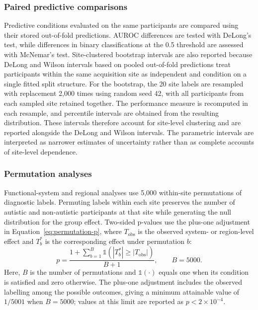 \subsubsection{Paired predictive comparisons}
\label{subsubsec:paired-comparisons}

Predictive conditions evaluated on the same participants are compared using their stored out-of-fold predictions. AUROC differences are tested with DeLong's test, while differences in binary classifications at the 0.5 threshold are assessed with McNemar's test. Site-clustered bootstrap intervals are also reported because DeLong and Wilson intervals based on pooled out-of-fold predictions treat participants within the same acquisition site as independent and condition on a single fitted split structure. For the bootstrap, the 20 site labels are resampled with replacement 2,000 times using random seed 42, with all participants from each sampled site retained together. The performance measure is recomputed in each resample, and percentile intervals are obtained from the resulting distribution. These intervals therefore account for site-level clustering and are reported alongside the DeLong and Wilson intervals. The parametric intervals are interpreted as narrower estimates of uncertainty rather than as complete accounts of site-level dependence.

\subsubsection{Permutation analyses}
\label{subsubsec:permutation-analyses}

Functional-system and regional analyses use 5,000 within-site permutations of diagnostic labels. Permuting labels within each site preserves the number of autistic and non-autistic participants at that site while generating the null distribution for the group effect. Two-sided p-values use the plus-one adjustment in Equation~\eqref{eq:permutation-p}, where $T_{\mathrm{obs}}$ is the observed system- or region-level effect and $T_b^\ast$ is the corresponding effect under permutation $b$:
\begin{equation}
p
=
\frac{
1
+
\sum_{b=1}^{B}
\mathbb{1}\left(
\left|T_b^\ast\right|
\geq
\left|T_{\mathrm{obs}}\right|
\right)
}{
B+1
},
\qquad B=5000.
\label{eq:permutation-p}
\end{equation}
Here, $B$ is the number of permutations and $\mathbb{1}(\cdot)$ equals one when its condition is satisfied and zero otherwise. The plus-one adjustment includes the observed labelling among the possible outcomes, giving a minimum attainable value of $1/5001$ when $B=5000$; values at this limit are reported as $p < 2\times10^{-4}$.

